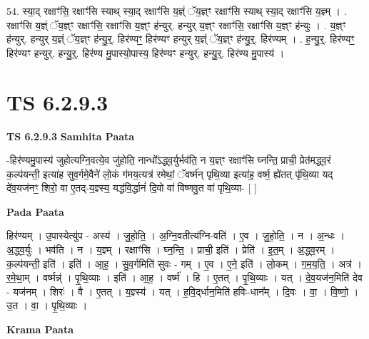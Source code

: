 \documentclass[17pt]{extarticle}
\begin{document}
54. स्या॒द् रक्षाꣳ॑सि॒ रक्षाꣳ॑सि स्याथ् स्या॒द् रक्षाꣳ॑सि य॒ज्ञ्ं ॅय॒ज्ञ्ꣳ रक्षाꣳ॑सि स्याथ् स्या॒द् रक्षाꣳ॑सि य॒ज्ञ्म् । . रक्षाꣳ॑सि य॒ज्ञ्ं ॅय॒ज्ञ्ꣳ रक्षाꣳ॑सि॒ रक्षाꣳ॑सि य॒ज्ञ्ꣳ ह॑न्युर्. हन्युर् य॒ज्ञ्ꣳ रक्षाꣳ॑सि॒ रक्षाꣳ॑सि य॒ज्ञ्ꣳ ह॑न्युः । . य॒ज्ञ्ꣳ ह॑न्युर्. हन्युर् य॒ज्ञ्ं ॅय॒ज्ञ्ꣳ ह॑न्यु॒र्॒. हिर॑ण्यꣳ॒॒ हिर॑ण्यꣳ हन्युर् य॒ज्ञ्ं ॅय॒ज्ञ्ꣳ ह॑न्यु॒र्॒. हिर॑ण्यम् । . ह॒न्यु॒र्॒. हिर॑ण्यꣳ॒॒ हिर॑ण्यꣳ हन्युर्. हन्यु॒र्॒. हिर॑ण्य मु॒पास्यो॒पास्य॒ हिर॑ण्यꣳ हन्युर्. हन्यु॒र्॒. हिर॑ण्य मु॒पास्य॑ । \newline
\pagebreak
{}

\section{ TS 6.2.9.3 }

\textbf{TS 6.2.9.3 } \newline
\textbf{Samhita Paata} \newline

-हिर॑ण्यमु॒पास्य॑ जुहोत्यग्नि॒वत्ये॒व जु॑होति॒ नान्धो᳚ऽद्ध्व॒र्युर्भव॑ति॒ न य॒ज्ञ्ꣳ रक्षाꣳ॑सि घ्नन्ति॒ प्राची॒ प्रेत॑मद्ध्व॒रं क॒ल्प॑यन्ती॒ इत्या॑ह सुव॒र्गमे॒वैने॑ लो॒कं ग॑मय॒त्यत्र॑ रमेथां॒ ॅवर्ष्म॑न् पृथि॒व्या इत्या॑ह॒ वर्ष्म॒ ह्ये॑तत् पृ॑थि॒व्या यद् दे॑व॒यज॑नꣳ॒॒ शिरो॒ वा ए॒तद्-य॒ज्ञ्स्य॒ यद्ध॑वि॒र्द्धानं॑ दि॒वो वा॑ विष्णवु॒त वा॑ पृथि॒व्या- [  ] \newline

\textbf{Pada Paata} \newline

हिर॑ण्यम् । उ॒पास्येत्यु॑प - अस्य॑ । जु॒हो॒ति॒ । अ॒ग्नि॒वतीत्य॑ग्नि-वति॑ । ए॒व । जु॒हो॒ति॒ । न । अ॒न्धः । अ॒द्ध्व॒र्युः । भव॑ति । न । य॒ज्ञ्म् । रक्षाꣳ॑सि । घ्न॒न्ति॒ । प्राची॒ इति॑ । प्रेति॑ । इ॒त॒म् । अ॒द्ध्व॒रम् । क॒ल्प॑यन्ती॒ इति॑ । इति॑ । आ॒ह॒ । सु॒व॒र्गमिति॑ सुवः - गम् । ए॒व । ए॒ने॒ इति॑ । लो॒कम् । ग॒म॒य॒ति॒ । अत्र॑ । र॒मे॒था॒म् । वर्ष्मन्न्॑ । पृ॒थि॒व्याः । इति॑ । आ॒ह॒ । वर्ष्म॑ । हि । ए॒तत् । पृ॒थि॒व्याः । यत् । दे॒व॒यज॑न॒मिति॑ देव - यज॑नम् । शिरः॑ । वै । ए॒तत् । य॒ज्ञ्स्य॑ । यत् । ह॒वि॒द्‌र्धान॒मिति॑ हविः-धान᳚म् । दि॒वः । वा॒ । वि॒ष्णो॒ । उ॒त । वा॒ । पृ॒थि॒व्याः ।  \newline


\textbf{Krama Paata} \newline
\end{document}
